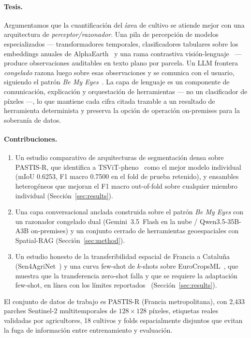 \paragraph{Tesis.}
Argumentamos que la cuantificación del área de cultivo se atiende mejor
con una arquitectura de \emph{perceptor/razonador}. Una pila de
percepción de modelos especializados --- transformadores temporales,
clasificadores tabulares sobre los embeddings anuales de
AlphaEarth~\cite{brown2025alphaearth} y una rama contrastiva
visión-lenguaje~\cite{li2025farslip} --- produce observaciones
auditables en texto plano por parcela. Un LLM frontera \emph{congelado}
razona luego sobre esas observaciones y se comunica con el usuario,
siguiendo el patrón \emph{Be My
Eyes}~\cite{huang2025bemyeyes}. La capa de lenguaje es un componente de
comunicación, explicación y orquestación de herramientas --- no un
clasificador de píxeles ---, lo que mantiene cada cifra citada trazable
a un resultado de herramienta determinista y preserva la opción de
operación on-premises para la soberanía de datos.

\paragraph{Contribuciones.}
\begin{enumerate}[leftmargin=*]
    \item Un estudio comparativo de arquitecturas de segmentación densa
    sobre PASTIS-R, que identifica a
    TSViT-pheno~\cite{tarasiou2023tsvit} como el mejor modelo individual
    (mIoU 0.6253, F1 macro 0.7500 en el fold de prueba retenido), y
    ensambles heterogéneos que mejoran el F1 macro out-of-fold sobre
    cualquier miembro individual
    (Sección~\ref{sec:results}).
    \item Una capa conversacional anclada construida sobre el patrón
    \emph{Be My Eyes} con un razonador congelado dual (Gemini~3.5~Flash en
    la nube / Qwen3.5-35B-A3B on-premises) y un conjunto cerrado de
    herramientas geoespaciales con Spatial-RAG
    (Sección~\ref{sec:method}).
    \item Un estudio honesto de la transferibilidad espacial de Francia a
    Cataluña (Sen4AgriNet~\cite{sykas2022sen4agrinet}) y una curva
    few-shot de $k$-shots sobre
    EuroCropsML~\cite{reuss2025eurocropsml}, que muestra que la
    transferencia zero-shot falla y que se requiere la adaptación
    few-shot, en línea con los límites
    reportados~\cite{harvesting2026alphaearth}
    (Sección~\ref{sec:results}).
\end{enumerate}

El conjunto de datos de trabajo es PASTIS-R (Francia metropolitana), con
2{,}433 parches Sentinel-2 multitemporales de $128\times128$ píxeles,
etiquetas reales validadas por agricultores, 18 cultivos y folds
espacialmente disjuntos que evitan la fuga de información entre
entrenamiento y evaluación.
